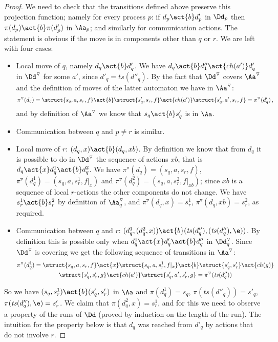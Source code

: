\documentclass[10pt,a4paper]{article}
\newcommand{\anca}[1]{}
\newcommand{\ts}{\mathit{ts}}
\newcommand{\red}[1]{#1^\triangledown}
\newcommand{\ch}{\mathop{ch}}
\begin{document}
\begin{proof}
  We need to check that the transitions defined above preserve this
  projection function; namely for every process $p$: if $d_p\act{b}
  d'_p$ in $\Dd_p$ then $\pi(d_p)\act{b}\pi(d'_p)$ in $\Aa_p$; and
  similarly for communication actions.  The statement is obvious if
  the move is in components other than $q$ or $r$. We are left with
  four cases:
  \begin{itemize}
  \item Local move of $q$, namely $d_q\act{b}d'_q$. We have
    $d_q\act{b}d''_1\act{\ch(a')} d'_q$ in $\red\Dd$ for some $a'$, since
    $d'_q=\ts(d''_q)$.  By the fact that
    $\red\Dd$ covers $\red\Aa$ and the definition of moves of the
    latter automaton we
    have in $\red\Aa$:
    \begin{equation*}
      \red\pi(d_q)=\struct{s_q,a,s_r,f}\act{b}\struct{s'_q,s_r,f}\act{\ch(a')}
      \struct{s'_q,a',s_r,f}=\red\pi(d'_q) \,,
    \end{equation*}
    and by definition of $\red\Aa$ we know that $s_q\act{b}s'_q$ is in $\Aa$.
  \item Communication between $q$ and $p\not=r$ is similar.
  \item Local move of $r$: $(d_q,x)\act{b}(d_q,xb)$. By definition we
    know that from $d_q$ it is possible to do in $\red\Dd$ the sequence of actions
    $xb$, that is $d_q\act{x} d^1_q\act{b}d^2_q$. \anca{old: We have
    $\red\pi(d_q)=(s_q,a,s_r,f)$, $\red\pi(d^1_q)=(s_q,a,s^1_r,f)$
    and $\red\pi(d^2_q)=(s_q,a,s^2_r,f)$;} 
    We have
    $\red\pi(d_q)=(s_q,a,s_r,f)$, $\red\pi(d^1_q)=(s_q,a,s^1_r,f|_x)$
    and $\red\pi(d^2_q)=(s_q,a,s^2_r,f|_{xb})$; since $xb$ is a sequence of
    local $r$-actions the other components do not change. We have
    $s^1_r\act{b}s^2_r$ by definition of $\red\Aa_q$, and $\red\pi(d_q,x)=s^1_r$,
    $\red\pi(d_q,xb)=s^2_r$, as required.  
  \item Communication between $q$ and $r$:
    $(d^1_q,(d^2_q,x))\act{b}(\ts(d''_q),(\ts(d''_q),\e))$. By
    definition this is possible only  when $d^1_q \act{x} d'_q \act{b} d''_q$ in
    $\red\Dd_q$. Since $\red\Dd$ is covering we get the following
    sequence of transitions in $\red\Aa$: \anca{changed f in f' below,
      f' in g}
    \begin{gather*}
      \red\pi(d^1_q)=\struct{s_q,a,s_r,f}\act{x}
      \struct{s_q,a,s^1_r,f|_x}\act{b}\struct{s'_q,s'_r}
      \act{\ch(g)}\\
      \struct{s'_q,s'_r,g}\act{\ch(a')}\struct{s'_q,a',s'_r,g}=
      \red\pi(\ts(d''_q)) 
    \end{gather*}
  \end{itemize}
  So we have $(s_q,s^1_r)\act{b}(s'_q,s'_r)$ in $\Aa$ and
  $\pi(d^1_q)=s_q$, $\pi(\ts(d''_q))=s'_q$, $\pi(\ts(d''_q),\e)=s'_r$.
  We claim that $\pi(d^2_q,x)=s^1_r$, and for this
   we need to observe a property of the runs of
  $\Dd$ (proved by induction on the length of the run). The intuition
  for the property below is that $d_q$ was reached from $d'_q$ by
  actions that do not involve $r$. \anca{added ``The intuition..''}


\end{proof}
\end{document}
